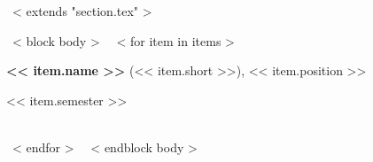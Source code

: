 ~< extends "section.tex" >~

~< block body >~
~< for item in items >~
\begin{minipage}[t]{0.8\textwidth}
	\textbf{<< item.name >>} (<< item.short >>), << item.position >>
\end{minipage}\hfill
\begin{minipage}[t]{0.2\textwidth}
  \hfill << item.semester >> 
\end{minipage}\\
~< endfor >~
~< endblock body >~
